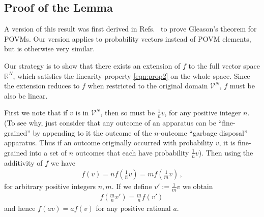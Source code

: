 \documentclass[%
 reprint,superscriptaddress,
 amsmath,amssymb,
 aps,pra, onecolumn, 12pt
]{revtex4-2}
\newcommand{\eqn}[1]{\begin{eqnarray} #1 \end{eqnarray}}
\begin{document}
\begin{appendix}
\section{Proof of the Lemma \label{app:prop2}}
A version of this result was first derived in Refs.\ \cite{BUSCH, RENES} to prove Gleason's theorem for POVMs. Our version applies to probability vectors instead of POVM elements, but is otherwise very similar.

Our strategy is to show that there exists an extension of $f$ to the full vector space $\mathbb{R}^N$, which satisfies the linearity property \eqref{eqn:prop2} on the whole space. Since the extension reduces to $f$ when restricted to the original domain $\mathcal{V}^N$, $f$ must be also be linear.

First we note that if $v$ is in $\mathcal{V}^N$, then so must be $\frac{1}{n} v$, for any positive integer $n$. (To see why, just consider that any outcome of an apparatus can be ``fine-grained'' by appending to it the outcome of the $n$-outcome ``garbage disposal'' apparatus.
Thus if an outcome originally occurred with probability $v$, it is fine-grained into a set of $n$ outcomes that each have probability $\frac{1}{n} v$). Then using the additivity of $f$ we have
\eqn{
f(v) = n f\left(\frac{1}{n}  v \right)
=  m f\left(\frac{1}{m}  v \right) \, ,
}
for arbitrary positive integers $n,m$. If we define $v':= \frac{1}{m} v$ we obtain
\eqn{
f\left(\frac{m}{n}  v' \right)
=  \frac{m}{n} f\left( v' \right) \,
}
and hence $f(a v) = a f(v)$ for any positive rational $a$.


\end{appendix}
\end{document}
